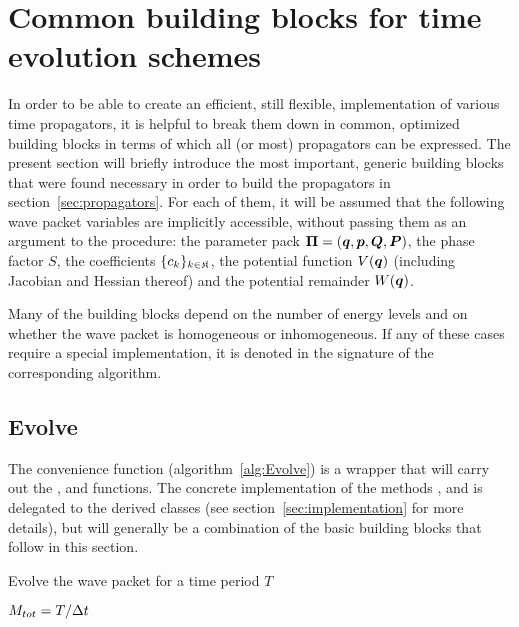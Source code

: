 \section{Common building blocks for time evolution schemes}
\label{sec:buildingblocks}
%
In order to be able to create an efficient, still flexible, implementation of various time propagators, it is helpful to break them down in common, optimized building blocks in terms of which all (or most) propagators can be expressed.
The present section will briefly introduce the most important, generic building blocks that were found necessary in order to build the propagators in section~\ref{sec:propagators}.
For each of them, it will be assumed that the following wave packet variables are implicitly accessible, without passing them as an argument to the procedure: the parameter pack $\bm{\Pi} = (\bm{q},\bm{p},\bm{Q},\bm{P})$, the phase factor $S$, the coefficients $\{ c_k \}_{k \in \mathfrak{K}}$, the potential function $V(\bm{q})$ (including Jacobian and Hessian thereof) and the potential remainder $W(\bm{q})$.
\par\medskip
%
Many of the building blocks depend on the number of energy levels and on whether the wave packet is homogeneous or inhomogeneous.
If any of these cases require a special implementation, it is denoted in the signature of the corresponding algorithm.


\subsection{Evolve}
\label{subsec:evolve}
The convenience function  (algorithm~\ref{alg:Evolve}) is a wrapper that will carry out the ,  and  functions.
The concrete implementation of the methods ,  and  is delegated to the derived classes (see section~\ref{sec:implementation} for more details),
but will generally be a combination of the basic building blocks that follow in this section.
%
\begin{algorithm}[ht]
	\caption{Evolve the wave packet for a time period $T$}
	\label{alg:Evolve}
	\begin{algorithmic}
		\State
		\State
		\State $M_{tot} = T/\Delta t$
		\State {}
			\State {}
		\EndFor
		\State {}
		\State
	\EndProcedure
	\end{algorithmic}
\end{algorithm}


